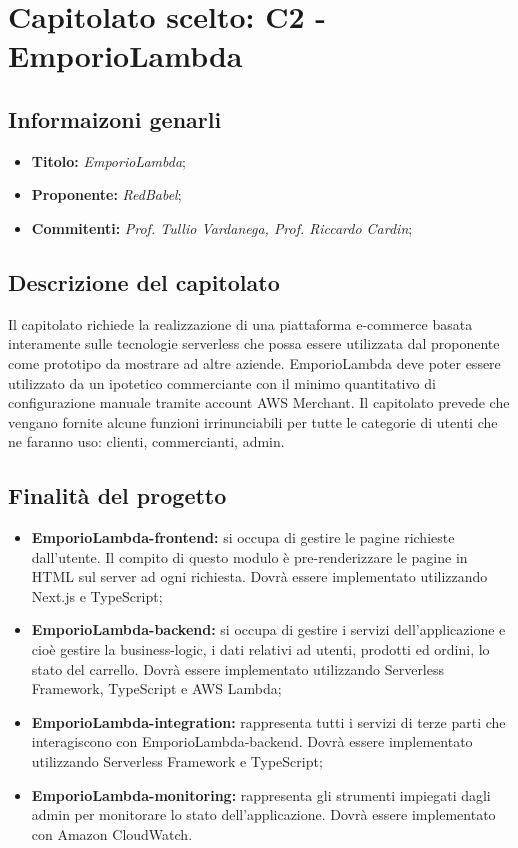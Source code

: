 \section{Capitolato scelto: C2 -  	EmporioLambda}
\subsection{Informaizoni genarli}
\begin{itemize}
    \item \textbf{Titolo:} \textit{EmporioLambda};
    \item \textbf{Proponente:} \textit{RedBabel};
    \item \textbf{Commitenti:} \textit{Prof. Tullio Vardanega, Prof. Riccardo Cardin};
\end{itemize}
\subsection{Descrizione del capitolato}
Il capitolato richiede la realizzazione di una piattaforma e-commerce 
basata interamente sulle tecnologie serverless che possa essere utilizzata 
dal proponente come prototipo da mostrare ad altre aziende. EmporioLambda 
deve poter essere utilizzato da un ipotetico commerciante con il minimo 
quantitativo di configurazione manuale tramite account AWS Merchant. 
Il capitolato prevede che vengano fornite alcune funzioni irrinunciabili 
per tutte le categorie di utenti che ne faranno uso: clienti, commercianti,
 admin.
\subsection{Finalità del progetto}
\begin{itemize}
    \item \textbf{EmporioLambda-frontend:} si occupa di gestire le pagine richieste dall’utente. Il compito di questo modulo è pre-renderizzare le pagine in HTML sul server ad ogni richiesta. Dovrà essere implementato utilizzando Next.js e TypeScript;
    \item \textbf{EmporioLambda-backend:} si occupa di gestire i servizi dell’applicazione e cioè gestire la business-logic, i dati relativi ad utenti, prodotti ed ordini, lo stato del carrello. Dovrà essere implementato utilizzando Serverless Framework, TypeScript e AWS Lambda;
    \item \textbf{EmporioLambda-integration:} rappresenta tutti i servizi di terze parti che interagiscono con EmporioLambda-backend. Dovrà essere implementato utilizzando Serverless Framework e TypeScript;
    \item \textbf{EmporioLambda-monitoring:} rappresenta gli strumenti impiegati dagli admin per monitorare lo stato dell’applicazione. Dovrà essere implementato con Amazon CloudWatch.
\end{itemize}
